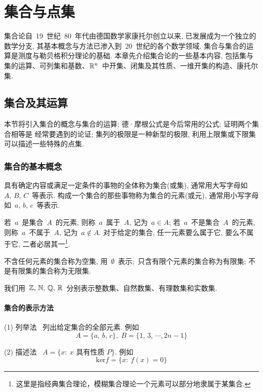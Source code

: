 \chapter{集合与点集} %

集合论自~19~世纪~80~年代由德国数学家康托尔创立以来, 已发展成为一个独立的数学分支, 其基本概念与方法已渗入到~20~世纪的各个数学领域. 集合与集合的运算是测度与勒贝格积分理论的基础. 本章先介绍集合论的一些基本内容, 包括集与集的运算、可列集和基数、$\mathbb{R}^n$~中开集、闭集及其性质、一维开集的构造、康托尔集.

\section{集合及其运算}

本节将引入集合的概念与集合的运算; 德·摩根公式是今后常用的公式; 证明两个集合相等是
经常要遇到的论证; 集列的极限是一种新型的极限, 利用上限集或下限集可以描述一些特殊的点集.

\subsection{集合的基本概念}

\begin{definition}
具有确定内容或满足一定条件的事物的全体称为集合(或集),
通常用大写字母如~$A,\,B, \,C$~等表示.
构成一个集合的那些事物称为集合的元素(或元),
通常用小写字母如~$a,\,b,\,c$~等表示.
\end{definition}

若~$a$~是集合~$A$~的元素, 则称~$a$~属于~$A$, 记为~$a \in A$; 若~$a$~不是集合~$A$~的元素, 则称~$a$~不属于~$A$, 记为~$a \notin A$. 对于给定的集合, 任一元素要么属于它, 要么不属于它, 二者必居其一\footnote{这里是指经典集合理论，模糊集合理论一个元素可以部分地隶属于某集合.}.

不含任何元素的集合称为空集, 用~$\emptyset$~表示;\  只含有限个元素的集合称为有限集;
不是有限集的集合称为无限集.

我们用~$\mathbb{Z},\, \mathbb{N},\, \mathbb{Q},\, \mathbb{R}$~分别表示整数集、自然数集、有理数集和实数集.

\subsubsection*{集合的表示方法}

(1) 列举法~\raisebox{0.5mm}{-----} 列出给定集合的全部元素. 例如
\[
A = \{a,\,b,\,c\}, \; B = \{1,\,3,\,\cdots,2n-1\}
\]

(2) 描述法~\raisebox{0.5mm}{-----} $A = \{x: \: x \mbox{~具有性质~} P \}$. 例如
\[
\mathrm{ker} f = \big\{ x: \: f(x) = 0 \big\}
\]

